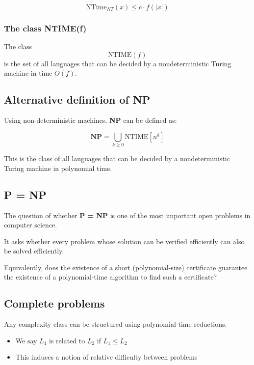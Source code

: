 \documentclass[11pt]{article}
\providecommand{\tightlist}{%
      \setlength{\itemsep}{0pt}\setlength{\parskip}{0pt}}
\begin{document}
\[
\text{NTime}_{NT} (x) \leq c \cdot f(|x|)
\]

\subsubsection{The class NTIME(f)}\label{the-class-ntimef}

The class \[
\text{NTIME}(f)
\] is the set of all languages that can be decided by a nondeterministic
Turing machine in time \(O(f)\).

\subsection{Alternative definition of
NP}\label{alternative-definition-of-np}

Using non-deterministic machines, \textbf{NP} can be defined as:

\[
\mathbf{NP} = \bigcup_{k \geq 0} \text{NTIME}[n^k]
\]

This is the class of all languages that can be decided by a
nondeterministic Turing machine in polynomial time.

    \subsection{\texorpdfstring{\textbf{P} =
\textbf{NP}}{P = NP}}\label{p-np}

The question of whether \textbf{P = NP} is one of the most important
open problems in computer science.

It asks whether every problem whose solution can be verified efficiently
can also be solved efficiently.

Equivalently, does the existence of a short (polynomial-size)
certificate guarantee the existence of a polynomial-time algorithm to
find such a certificate?

    \subsection{Complete problems}\label{complete-problems}

Any complexity class can be structured using polynomial-time reductions.

\begin{itemize}
\tightlist
\item
  We say \(L_1\) is related to \(L_2\) if \(L_1 \leq L_2\)
\item
  This induces a notion of relative difficulty between problems
\end{itemize}
\end{document}
